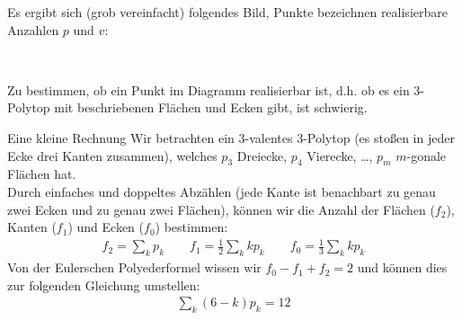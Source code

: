 \documentclass[10pt, notheorems]{beamer}
\begin{document}
\begin{frame}
  Es ergibt sich (grob vereinfacht) folgendes Bild, Punkte bezeichnen realisierbare Anzahlen $p$ und $v$:

  \vspace{0.5cm}
  { \centering
    \\
  }
  \vspace{0.5cm}
  \pause
  Zu bestimmen, ob ein Punkt im Diagramm realisierbar ist, d.h. ob es ein $3$-Polytop mit beschriebenen Flächen und Ecken gibt, ist schwierig.
\end{frame}

\begin{frame}{Eine kleine Rechnung}
  Wir betrachten ein $3$-valentes $3$-Polytop (es stoßen in jeder Ecke drei Kanten zusammen), welches $p_3$ Dreiecke, $p_4$ Vierecke, \dots, $p_m$ $m$-gonale Flächen hat.\\
  \pause
  Durch  einfaches und doppeltes Abzählen (jede Kante ist benachbart zu genau zwei Ecken und zu genau zwei Flächen), können wir die Anzahl der Flächen ($f_2$), Kanten ($f_1$) und Ecken ($f_0$) bestimmen:
  \begin{align*}
    f_2 = \sum_k p_k \qquad f_1 = \tfrac{1}{2}\sum_k k p_k \qquad f_0 = \tfrac{1}{3}\sum_k k p_k
  \end{align*}
  \pause
  Von der {\sc Euler}schen Polyederformel wissen wir $f_0 - f_1 + f_2 = 2$ und können dies zur folgenden Gleichung umstellen:
  \begin{align*}
    \sum_k (6 - k) p_k = 12
  \end{align*}
\end{frame}
\end{document}
